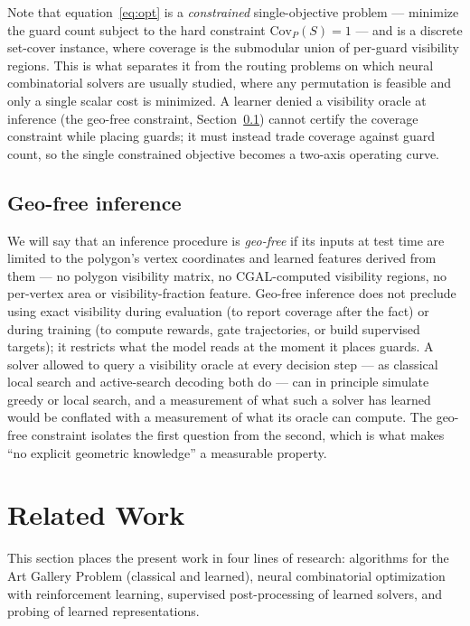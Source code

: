 \documentclass[preprint,10pt]{elsarticle}
\newcommand{\Covf}[1]{\mathrm{Cov}_P(#1)}
\begin{document}
Note that equation~\eqref{eq:opt} is a \emph{constrained} single-objective problem --- minimize the guard count subject to the hard constraint $\Covf{S} = 1$ --- and is a discrete set-cover instance, where coverage is the submodular union of per-guard visibility regions. This is what separates it from the routing problems on which neural combinatorial solvers are usually studied, where any permutation is feasible and only a single scalar cost is minimized. A learner denied a visibility oracle at inference (the geo-free constraint, Section~\ref{sec:problem-geofree}) cannot certify the coverage constraint while placing guards; it must instead trade coverage against guard count, so the single constrained objective becomes a two-axis operating curve. 

\subsection{Geo-free inference}
\label{sec:problem-geofree}

We will say that an inference procedure is \emph{geo-free} if its inputs at test time are limited to the polygon's vertex coordinates and learned features derived from them --- no polygon visibility matrix, no CGAL-computed visibility regions, no per-vertex area or visibility-fraction feature. Geo-free inference does not preclude using exact visibility during evaluation (to report coverage after the fact) or during training (to compute rewards, gate trajectories, or build supervised targets); it restricts what the model reads at the moment it places guards. A solver allowed to query a visibility oracle at every decision step --- as classical local search and active-search decoding both do --- can in principle simulate greedy or local search, and a measurement of what such a solver has learned would be conflated with a measurement of what its oracle can compute. The geo-free constraint isolates the first question from the second, which is what makes ``no explicit geometric knowledge'' a measurable property.

\section{Related Work}
\label{sec:related}

This section places the present work in four lines of research: algorithms for the Art Gallery Problem (classical and learned), neural combinatorial optimization with reinforcement learning, supervised post-processing of learned solvers, and probing of learned representations.
\end{document}
